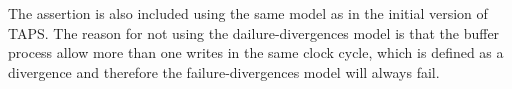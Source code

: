 The assertion is also included using the same model as in the initial version of TAPS. The reason for not using the dailure-divergences model is that the buffer process allow more than one writes in the same clock cycle, which is defined as a divergence and therefore the failure-divergences model will always fail.


%


